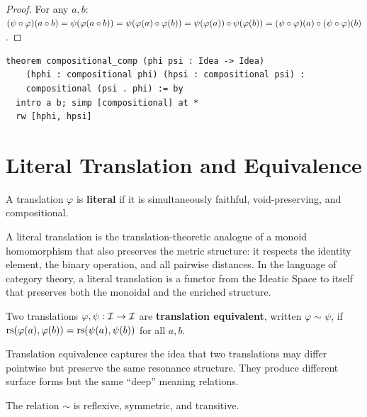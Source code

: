 \begin{proof}
For any $a, b$:
$(\psi \circ \varphi)(a \circ b)
 = \psi(\varphi(a \circ b))
 = \psi(\varphi(a) \circ \varphi(b))
 = \psi(\varphi(a)) \circ \psi(\varphi(b))
 = (\psi \circ \varphi)(a) \circ (\psi \circ \varphi)(b)$.
\end{proof}

\begin{lstlisting}
theorem compositional_comp (phi psi : Idea -> Idea)
    (hphi : compositional phi) (hpsi : compositional psi) :
    compositional (psi . phi) := by
  intro a b; simp [compositional] at *
  rw [hphi, hpsi]
\end{lstlisting}

\section{Literal Translation and Equivalence}
\label{sec:translation:literal}

\begin{definition}
\label{def:literal}
A translation $\varphi$ is \textbf{literal} if it is simultaneously
faithful, void-preserving, and compositional.
\end{definition}

A literal translation is the translation-theoretic analogue of a monoid
homomorphism that also preserves the metric structure: it respects the
identity element, the binary operation, and all pairwise distances.  In
the language of category theory, a literal translation is a functor from
the Ideatic Space to itself that preserves both the monoidal and the
enriched structure.

\begin{definition}
\label{def:translation-equiv}
Two translations $\varphi, \psi : \mathcal{I} \to \mathcal{I}$ are \textbf{translation
equivalent}, written $\varphi \sim \psi$, if
$\mathrm{rs}(\varphi(a), \varphi(b)) = \mathrm{rs}(\psi(a), \psi(b))$ for all $a, b$.
\end{definition}

Translation equivalence captures the idea that two translations may differ
pointwise but preserve the same resonance structure.  They produce
different surface forms but the same ``deep'' meaning relations.

\begin{theorem}
\label{thm:translation-equiv-equiv}
The relation $\sim$ is reflexive, symmetric, and transitive.
\end{theorem}

